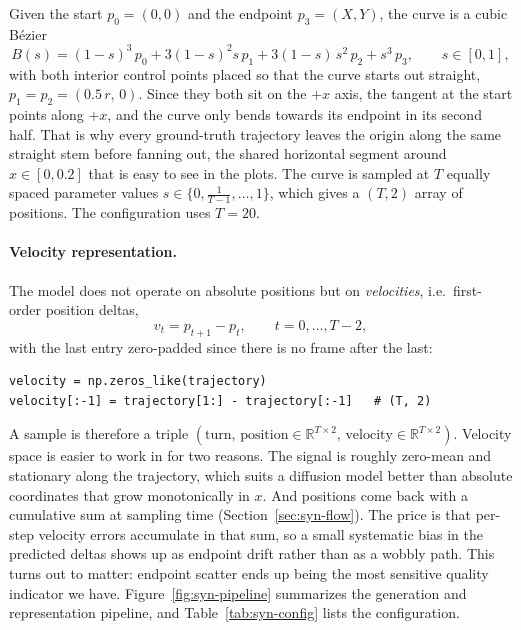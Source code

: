 Given the start $p_0=(0,0)$ and the endpoint $p_3=(X,Y)$, the curve is a cubic
B\'ezier
\begin{equation}
B(s) = (1-s)^3\,p_0 + 3(1-s)^2 s\,p_1 + 3(1-s)\,s^2\,p_2 + s^3\,p_3,
\qquad s\in[0,1],
\label{eq:bezier}
\end{equation}
with both interior control points placed so that the curve starts out straight,
$p_1 = p_2 = (0.5\,r,\,0)$. Since they both sit on the $+x$ axis, the tangent at
the start points along $+x$, and the curve only bends towards its endpoint in its
second half. That is why every ground-truth trajectory leaves the origin along
the same straight stem before fanning out, the shared horizontal segment around
$x\in[0,0.2]$ that is easy to see in the plots. The curve is sampled at $T$
equally spaced parameter values $s\in\{0,\tfrac{1}{T-1},\dots,1\}$, which gives a
$(T,2)$ array of positions. The configuration uses $T=20$.

\paragraph{Velocity representation.}
The model does not operate on absolute positions but on \emph{velocities}, i.e.\
first-order position deltas,
\begin{equation}
v_t = p_{t+1} - p_t,\qquad t=0,\dots,T-2,
\label{eq:velocity}
\end{equation}
with the last entry zero-padded since there is no frame after the last:
\begin{lstlisting}
velocity = np.zeros_like(trajectory)
velocity[:-1] = trajectory[1:] - trajectory[:-1]   # (T, 2)
\end{lstlisting}
A sample is therefore a triple $(\text{turn},\,\text{position}\in\mathbb{R}^{T\times2},\,
\text{velocity}\in\mathbb{R}^{T\times2})$. Velocity space is easier to work in
for two reasons. The signal is roughly zero-mean and stationary along the
trajectory, which suits a diffusion model better than absolute coordinates that
grow monotonically in $x$. And positions come back with a cumulative sum at
sampling time (Section~\ref{sec:syn-flow}). The price is that per-step velocity
errors accumulate in that sum, so a small systematic bias in the predicted deltas
shows up as endpoint drift rather than as a wobbly path. This turns out to
matter: endpoint scatter ends up being the most sensitive quality indicator we
have. Figure~\ref{fig:syn-pipeline} summarizes the generation and representation
pipeline, and Table~\ref{tab:syn-config} lists the configuration.

